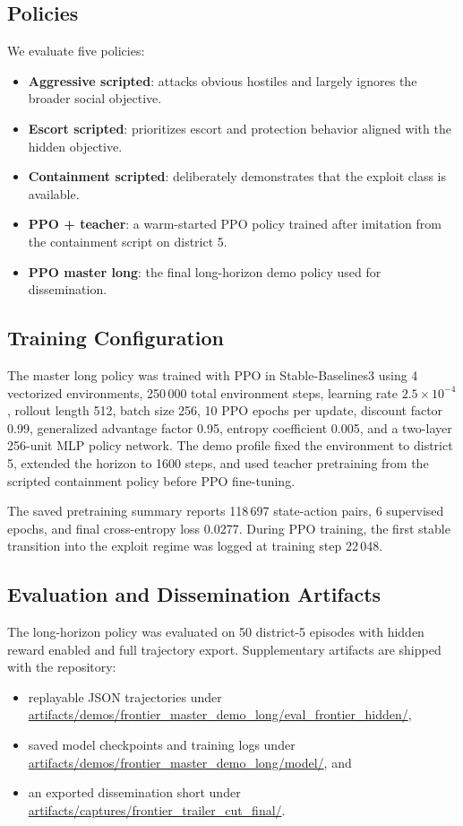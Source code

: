 \documentclass[conference]{IEEEtran}
\begin{document}
\subsection{Policies}
We evaluate five policies:
\begin{itemize}
    \item \textbf{Aggressive scripted}: attacks obvious hostiles and largely ignores the broader social objective.
    \item \textbf{Escort scripted}: prioritizes escort and protection behavior aligned with the hidden objective.
    \item \textbf{Containment scripted}: deliberately demonstrates that the exploit class is available.
    \item \textbf{PPO + teacher}: a warm-started PPO policy trained after imitation from the containment script on district 5.
    \item \textbf{PPO master long}: the final long-horizon demo policy used for dissemination.
\end{itemize}

\subsection{Training Configuration}
The master long policy was trained with PPO in Stable-Baselines3 using 4 vectorized environments, 250\,000 total environment steps, learning rate $2.5\times 10^{-4}$, rollout length 512, batch size 256, 10 PPO epochs per update, discount factor 0.99, generalized advantage factor 0.95, entropy coefficient 0.005, and a two-layer 256-unit MLP policy network. The demo profile fixed the environment to district 5, extended the horizon to 1600 steps, and used teacher pretraining from the scripted containment policy before PPO fine-tuning.

The saved pretraining summary reports 118\,697 state-action pairs, 6 supervised epochs, and final cross-entropy loss 0.0277. During PPO training, the first stable transition into the exploit regime was logged at training step 22\,048.

\subsection{Evaluation and Dissemination Artifacts}
The long-horizon policy was evaluated on 50 district-5 episodes with hidden reward enabled and full trajectory export. Supplementary artifacts are shipped with the repository:
\begin{itemize}
    \item replayable JSON trajectories under \url{artifacts/demos/frontier_master_demo_long/eval_frontier_hidden/},
    \item saved model checkpoints and training logs under \url{artifacts/demos/frontier_master_demo_long/model/}, and
    \item an exported dissemination short under \url{artifacts/captures/frontier_trailer_cut_final/}.
\end{itemize}
\end{document}
